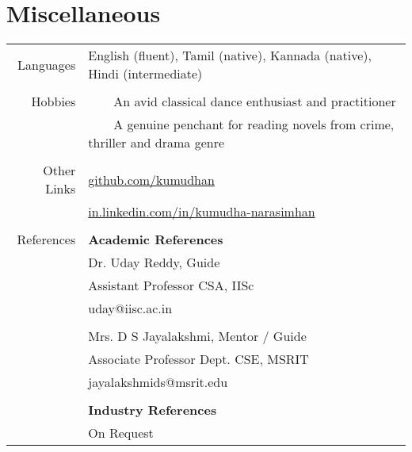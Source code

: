 \documentclass[a4paper,10pt]{article} %
\newcommand{\tabitem}{~~\llap{\textbullet}~~}
\begin{document}


\section{Miscellaneous}
\begin{tabular}{rl}
Languages & English (fluent), Tamil (native), Kannada (native), Hindi (intermediate)\\
&\\
Hobbies & \tabitem An avid classical dance enthusiast and practitioner\\
& \tabitem A genuine penchant for reading novels from crime, thriller and drama genre\\
& \\
Other Links & \href{https://github.com/kumudhan}{github.com/kumudhan} \\
& \href{http://in.linkedin.com/in/kumudha-narasimhan}{in.linkedin.com/in/kumudha-narasimhan}\\
&\\
References & \textbf{Academic References} \\
& Dr. Uday Reddy, Guide \\
& Assistant Professor CSA, IISc\\
& uday@iisc.ac.in \\
&\\
& Mrs. D S Jayalakshmi, Mentor / Guide  \\
& Associate Professor Dept. CSE, MSRIT \\
& jayalakshmids@msrit.edu\\
&\\

& \textbf{Industry References} \\
& On Request \\
\end{tabular}
\end{document}
